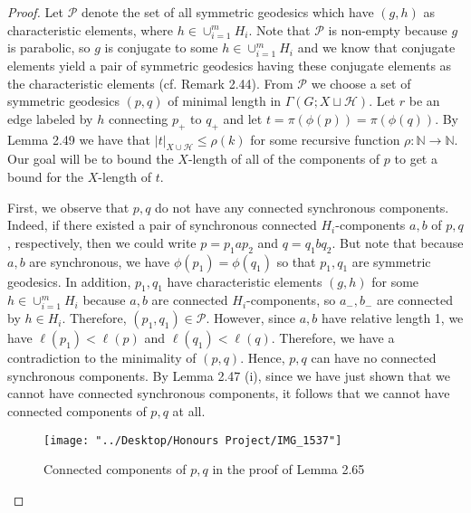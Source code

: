 \documentclass[12pt]{article}
\newcommand{\vs}{\vskip10pt}
\begin{document}
	\begin{proof}
		
		Let $\mathcal{P}$ denote the set of all symmetric geodesics which have $(g,h)$ as characteristic elements, where $h \in \cup_{i=1}^m H_i$. Note that $\mathcal{P}$ is non-empty because $g$ is parabolic, so $g$ is conjugate to some $h \in \cup_{i=1}^m H_i$ and we know that conjugate elements yield a pair of symmetric geodesics having these conjugate elements as the characteristic elements (cf. Remark 2.44). From $\mathcal{P}$ we choose a set of symmetric geodesics $(p,q)$ of minimal length in $\Gamma(G; X \sqcup \mathcal{H})$. Let $r$ be an edge labeled by $h$ connecting $p_+$ to $q_+$ and let $t = \pi(\phi(p)) = \pi(\phi(q))$. By Lemma 2.49 we have that $\vert t \vert_{X \cup \mathcal{H}} \leq \rho(k)$ for some recursive function $\rho: \mathbb{N} \rightarrow \mathbb{N}$. Our goal will be to bound the $X$-length of all of the components of $p$ to get a bound for the $X$-length of $t$. 
		
		\vs 
		
		First, we observe that $p,q$ do not have any connected synchronous components. Indeed, if there existed a pair of synchronous connected $H_i$-components $a,b$ of $p,q$, respectively, then we could write $p = p_1 a p_2$ and $q = q_1 b q_2$. But note that because $a,b$ are synchronous, we have $\phi(p_1) = \phi(q_1)$ so that $p_1, q_1$ are symmetric geodesics. In addition, $p_1, q_1$ have characteristic elements $(g,h)$ for some $h \in \cup_{i=1}^m H_i$ because $a,b$ are connected $H_i$-components, so $a_{-}, b_{-}$ are connected by $h \in H_i$. Therefore, $(p_1,q_1) \in \mathcal{P}$. However, since $a,b$ have relative length 1, we have $\ell(p_1) < \ell(p)$ and $\ell(q_1) < \ell(q)$. Therefore, we have a contradiction to the minimality of $(p,q)$. Hence, $p,q$ can have no connected synchronous components. By Lemma 2.47 (i), since we have just shown that we cannot have connected synchronous components, it follows that we cannot have connected components of $p,q$ at all. 
		
\begin{figure} [H]
	\centering
	\texttt{[image: "../Desktop/Honours Project/IMG\_1537"]}
	\caption{Connected components of $p,q$ in the proof of Lemma 2.65}
	\label{fig:img1537}
\end{figure}
		
		\vs 
		

\end{proof}
\end{document}
